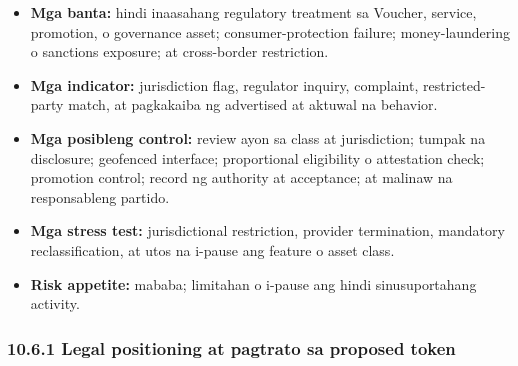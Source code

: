 \documentclass[11pt]{article}
\begin{document}
\begin{itemize}[leftmargin=*]
\item \textbf{Mga banta:} hindi inaasahang regulatory treatment sa Voucher, service, promotion, o governance asset; consumer-protection failure; money-laundering o sanctions exposure; at cross-border restriction.
\item \textbf{Mga indicator:} jurisdiction flag, regulator inquiry, complaint, restricted-party match, at pagkakaiba ng advertised at aktuwal na behavior.
\item \textbf{Mga posibleng control:} review ayon sa class at jurisdiction; tumpak na disclosure; geofenced interface; proportional eligibility o attestation check; promotion control; record ng authority at acceptance; at malinaw na responsableng partido.
\item \textbf{Mga stress test:} jurisdictional restriction, provider termination, mandatory reclassification, at utos na i-pause ang feature o asset class.
\item \textbf{Risk appetite:} mababa; limitahan o i-pause ang hindi sinusuportahang activity.
\end{itemize}
\subsubsection*{10.6.1 Legal positioning at pagtrato sa proposed token}
\end{document}
